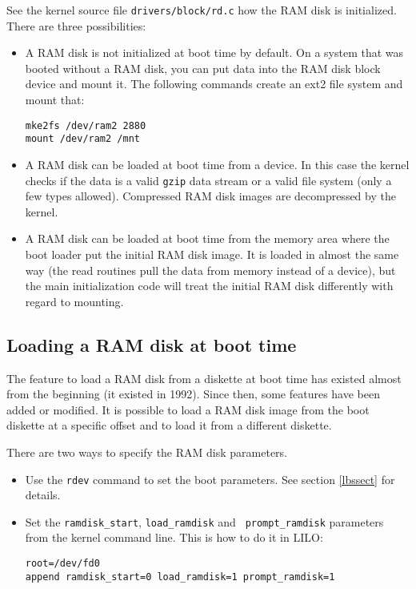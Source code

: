 \documentclass[12pt,a4paper]{article}
\begin{document}
See the kernel source file {\tt drivers/block/rd.c} how the RAM disk
is initialized. There are three possibilities:
\begin{itemize}
\item A RAM disk is not initialized at boot time by default. On a
  system that was booted without a RAM disk, you can put data into the
  RAM disk block device and mount it. The following commands create an
  ext2 file system and mount that:
\begin{verbatim}
mke2fs /dev/ram2 2880
mount /dev/ram2 /mnt
\end{verbatim}
\item A RAM disk can be loaded at boot time from a device. In this
  case the kernel checks if the data is a valid {\tt gzip} data stream
  or a valid file system (only a few types allowed). Compressed RAM
  disk images are decompressed by the kernel.
\item A RAM disk can be loaded at boot time from the memory area where
  the boot loader put the initial RAM disk image. It is loaded in almost the
  same way (the read routines pull the data from memory instead of a
  device), but the main initialization code will treat the initial RAM
  disk differently with regard to mounting.
\end{itemize}

\subsection{Loading a RAM disk at boot time}

The feature to load a RAM disk from a diskette at boot time has
existed almost from the beginning (it existed in 1992). Since then,
some features have been added or modified. It is possible to load a
RAM disk image from the boot diskette at a specific offset and to load
it from a different diskette.

There are two ways to specify the RAM disk parameters.
\begin{itemize}
\item
Use the {\tt rdev} command to set the boot parameters. See section
\ref{lbssect} for details.
\item Set the {\tt ramdisk\_start}, {\tt load\_ramdisk} and {\tt
  prompt\_ramdisk} parameters from the kernel command line. This is
  how to do it in LILO:
\begin{verbatim}
root=/dev/fd0
append ramdisk_start=0 load_ramdisk=1 prompt_ramdisk=1
\end{verbatim}
\end{itemize}
\end{document}
